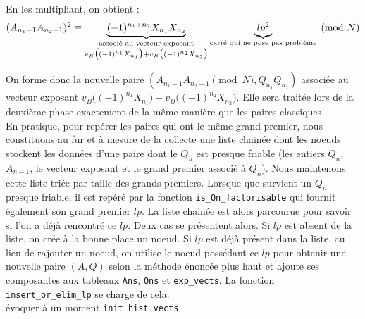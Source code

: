 En les multipliant, on obtient : 
\[  (A_{n_1 -1} A_{n_2 -1})^2 \equiv 
     \underbrace{(-1)^{n_1 + n_2} X_{n_1} X_{n_2}}_
            {\begin{subarray}{c}\text{associé au vecteur exposant}\\
             v_{B} \big( (-1 )^{n_1} X_{n_1} \big)
             + v_{B} \big( (-1 )^{n_2} X_{n_2} \big) \end{subarray}
             }
    \underbrace{lp^2}_{\text{carré qui ne pose pas problème}}
    \pmod{N}
 \]
  
On forme donc la nouvelle paire $ (A_{n_1-1}A_{n_2 -1} \pmod{N}, Q_{n_1}Q_{n_2}) $
associée au vecteur exposant $v_{B} \big( (-1 )^{n_1} X_{n_1} \big)+
v_{B} \big( (-1 )^{n_2} X_{n_2} \big) $.  Elle sera traitée lors de la 
deuxième phase exactement de la même manière que les paires \og classiques \fg{}.\\

En pratique, pour repérer les paires qui ont le même grand premier, nous
constituons au fur et à mesure de la collecte une liste chainée dont les noeuds
stockent les données d'une paire dont le $Q_n$ est presque friable (les entiers
$Q_n$, $A_{n-1}$, le vecteur exposant et le grand premier associé à $Q_n$). Nous
maintenons cette liste triée par taille des grands premiers. Lorsque que survient
un $Q_n$ presque friable, il est repéré par la fonction
\texttt{is\_Qn\_factorisable} qui fournit également son grand premier $lp$. La 
liste chainée est alors parcourue pour savoir si l'on a déjà rencontré ce $lp$.
Deux cas se présentent alors. Si $lp$ est absent de la liste, on crée à la bonne
place un noeud. Si $lp$ est déjà présent dans la liste, au lieu de rajouter un
noeud, on utilise le noeud possédant ce $lp$ pour obtenir une nouvelle paire
$(A,Q)$ selon la méthode énoncée plus haut et ajoute ses composantes aux tableaux
\texttt{Ans}, \texttt{Qns} et \texttt{exp\_vects}. La fonction
\texttt{insert\_or\_elim\_lp} se charge de cela. \\

évoquer à un moment \texttt{init\_hist\_vects}\\ 



